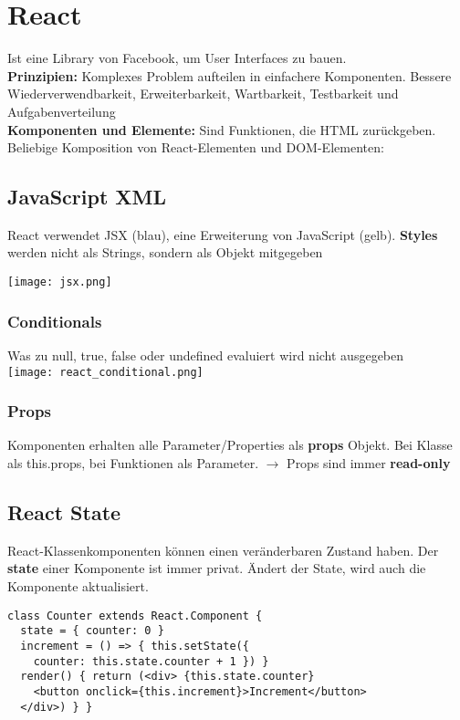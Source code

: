 
\section{React}
Ist eine Library von Facebook, um User Interfaces zu bauen.\\
\textcolor{b}{\textbf{Prinzipien:}} Komplexes Problem aufteilen in einfachere Komponenten. Bessere Wiederverwendbarkeit, Erweiterbarkeit, Wartbarkeit, Testbarkeit und Aufgabenverteilung\\
\textcolor{b}{\textbf{Komponenten und Elemente:}} Sind Funktionen, die HTML zurückgeben. Beliebige Komposition von React-Elementen und DOM-Elementen:
\subsection{JavaScript XML}
\begin{minipage}{0.4\linewidth}
  React verwendet JSX (blau), eine Erweiterung von JavaScript (gelb). \textbf{Styles} werden nicht als Strings, sondern als Objekt mitgegeben
\end{minipage}
\begin{minipage}{0.6\linewidth}
  \texttt{[image: jsx.png]}
\end{minipage}
\subsubsection{Conditionals}
Was zu null, true, false oder undefined evaluiert wird nicht ausgegeben\\
\texttt{[image: react\_conditional.png]}
\subsubsection{Props}
Komponenten erhalten alle Parameter/Properties als \textbf{props} Objekt. Bei Klasse als \textcolor{b}{this.props}, bei Funktionen als Parameter. $\rightarrow$ Props sind immer \textbf{read-only}
\subsection{React State}
React-Klassenkomponenten können einen veränderbaren Zustand haben. Der \textbf{state} einer Komponente ist immer privat. Ändert der State, wird auch die Komponente aktualisiert.
\begin{lstlisting}[style=htmlcssjs]
class Counter extends React.Component {
  state = { counter: 0 }
  increment = () => { this.setState({
    counter: this.state.counter + 1 }) }
  render() { return (<div> {this.state.counter}
    <button onclick={this.increment}>Increment</button>
  </div>) } }
\end{lstlisting}
